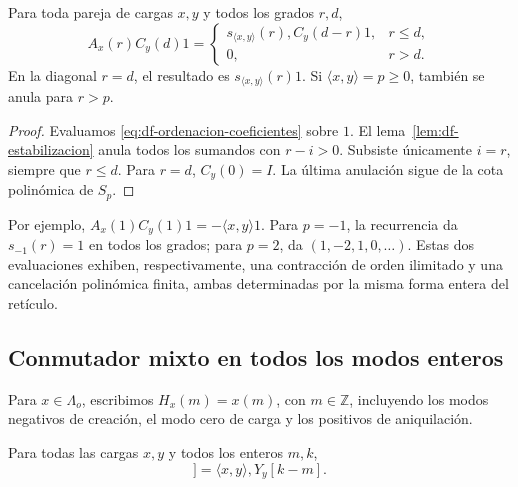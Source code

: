 \begin{theorem}
\label{thm:df-contraccion-vacio}
Para toda pareja de cargas \(x,y\) y todos los grados \(r,d\),
\begin{equation}
 A_x(r)C_y(d)1=
 \begin{cases}
 s_{\langle x,y\rangle}(r),C_y(d-r)1,&r\leq d,\\
 0,&r>d.
 \end{cases}
 \label{eq:df-contraccion-vacio}
\end{equation}
En la diagonal \(r=d\), el resultado es
\(s_{\langle x,y\rangle}(r)1\). Si
\(\langle x,y\rangle=p\geq0\), también se anula para \(r>p\).
\end{theorem}

\begin{proof}
Evaluamos \eqref{eq:df-ordenacion-coeficientes} sobre \(1\).
El lema~\ref{lem:df-estabilizacion} anula todos los sumandos con
\(r-i>0\). Subsiste únicamente \(i=r\), siempre que \(r\leq d\).
Para \(r=d\), \(C_y(0)=I\). La última anulación sigue de la cota
polinómica de \(S_p\).
\end{proof}

Por ejemplo, \(A_x(1)C_y(1)1=-\langle x,y\rangle1\).
Para \(p=-1\), la recurrencia da \(s_{-1}(r)=1\) en todos los grados;
para \(p=2\), da \((1,-2,1,0,\ldots)\). Estas dos evaluaciones
exhiben, respectivamente, una contracción de orden ilimitado y una
cancelación polinómica finita, ambas determinadas por la misma forma
entera del retículo.

\subsection{Conmutador mixto en todos los modos enteros}
\label{subsec:df-conmutador-mixto}


Para \(x\in\Lambda_o\), escribimos \(H_x(m)=x(m)\), con
\(m\in\mathbb Z\), incluyendo los modos negativos de creación,
el modo cero de carga y los positivos de aniquilación.

\begin{theorem}
\label{thm:df-conmutador-mixto}
Para todas las cargas \(x,y\) y todos los enteros \(m,k\),
\begin{equation}
 [H_x(m),Y_y[k]]
 =\langle x,y\rangle,Y_y[k-m].
 \label{eq:df-conmutador-mixto}
\end{equation}
\end{theorem}

